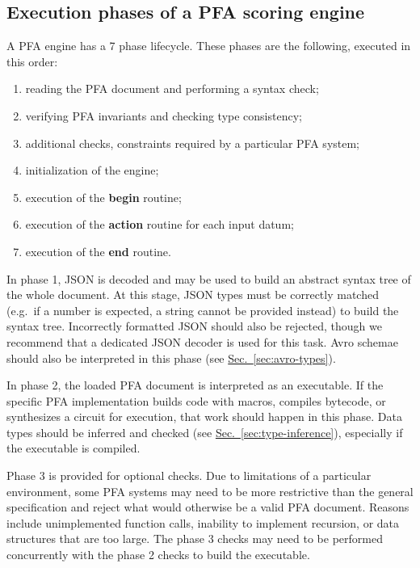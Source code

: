 \documentclass{article}
\newcommand{\PFAc}{\ttfamily\bfseries}
\theoremstyle{definition}
\begin{document}
\hypertarget{hsec:phases}{}
\subsection{Execution phases of a PFA scoring engine}
\label{sec:phases}

A PFA engine has a 7 phase lifecycle.  These phases are the following, executed in this order:

\begin{enumerate}
\item reading the PFA document and performing a syntax check;
\item verifying PFA invariants and checking type consistency;
\item additional checks, constraints required by a particular PFA system;
\item initialization of the engine;
\item execution of the {\PFAc begin} routine;
\item execution of the {\PFAc action} routine for each input datum;
\item execution of the {\PFAc end} routine.
\end{enumerate}

In phase 1, JSON is decoded and may be used to build an abstract syntax tree of the whole document.  At this stage, JSON types must be correctly matched (e.g.\ if a number is expected, a string cannot be provided instead) to build the syntax tree.  Incorrectly formatted JSON should also be rejected, though we recommend that a dedicated JSON decoder is used for this task.  Avro schemae should also be interpreted in this phase (see \hyperlink{hsec:avro-types}{Sec.~\ref{sec:avro-types}}).

In phase 2, the loaded PFA document is interpreted as an executable.  If the specific PFA implementation builds code with macros, compiles bytecode, or synthesizes a circuit for execution, that work should happen in this phase.  Data types should be inferred and checked (see \hyperlink{hsec:type-inference}{Sec.~\ref{sec:type-inference}}), especially if the executable is compiled.

Phase 3 is provided for optional checks.  Due to limitations of a particular environment, some PFA systems may need to be more restrictive than the general specification and reject what would otherwise be a valid PFA document.  Reasons include unimplemented function calls, inability to implement recursion, or data structures that are too large.  The phase 3 checks may need to be performed concurrently with the phase 2 checks to build the executable.
\end{document}
